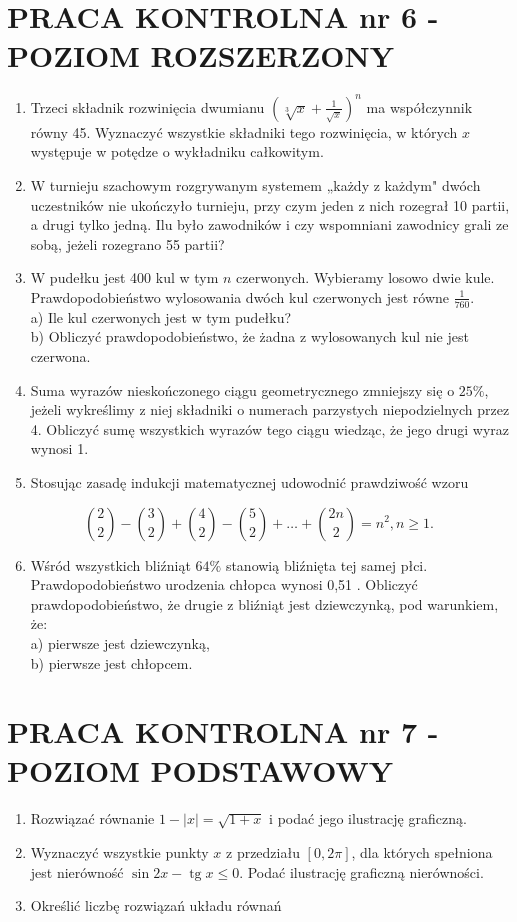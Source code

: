 \documentclass[10pt]{article}
\begin{document}
\section*{PRACA KONTROLNA nr 6 - POZIOM ROZSZERZONY}
\begin{enumerate}
  \item Trzeci składnik rozwinięcia dwumianu $\left(\sqrt[3]{x}+\frac{1}{\sqrt{x}}\right)^{n}$ ma współczynnik równy 45. Wyznaczyć wszystkie składniki tego rozwinięcia, w których $x$ występuje w potędze o wykładniku całkowitym.
  \item W turnieju szachowym rozgrywanym systemem „każdy z każdym" dwóch uczestników nie ukończyło turnieju, przy czym jeden z nich rozegrał 10 partii, a drugi tylko jedną. Ilu było zawodników i czy wspomniani zawodnicy grali ze sobą, jeżeli rozegrano 55 partii?
  \item W pudełku jest 400 kul w tym $n$ czerwonych. Wybieramy losowo dwie kule. Prawdopodobieństwo wylosowania dwóch kul czerwonych jest równe $\frac{1}{760}$.\\
a) Ile kul czerwonych jest w tym pudełku?\\
b) Obliczyć prawdopodobieństwo, że żadna z wylosowanych kul nie jest czerwona.
  \item Suma wyrazów nieskończonego ciągu geometrycznego zmniejszy się o $25 \%$, jeżeli wykreślimy z niej składniki o numerach parzystych niepodzielnych przez 4. Obliczyć sumę wszystkich wyrazów tego ciągu wiedząc, że jego drugi wyraz wynosi 1.
  \item Stosując zasadę indukcji matematycznej udowodnić prawdziwość wzoru
\end{enumerate}

$$
\binom{2}{2}-\binom{3}{2}+\binom{4}{2}-\binom{5}{2}+\ldots+\binom{2 n}{2}=n^{2}, n \geqslant 1 .
$$

\begin{enumerate}
  \setcounter{enumi}{5}
  \item Wśród wszystkich bliźniąt $64 \%$ stanowią bliźnięta tej samej płci. Prawdopodobieństwo urodzenia chłopca wynosi 0,51 . Obliczyć prawdopodobieństwo, że drugie z bliźniąt jest dziewczynką, pod warunkiem, że:\\
a) pierwsze jest dziewczynką,\\
b) pierwsze jest chłopcem.
\end{enumerate}

\section*{PRACA KONTROLNA nr 7 - POZIOM PODSTAWOWY}
\begin{enumerate}
  \item Rozwiązać równanie $1-|x|=\sqrt{1+x}$ i podać jego ilustrację graficzną.
  \item Wyznaczyć wszystkie punkty $x$ z przedziału $[0,2 \pi]$, dla których spełniona jest nierówność $\sin 2 x-\operatorname{tg} x \leqslant 0$. Podać ilustrację graficzną nierówności.
  \item Określić liczbę rozwiązań układu równań
\end{enumerate}
\end{document}

